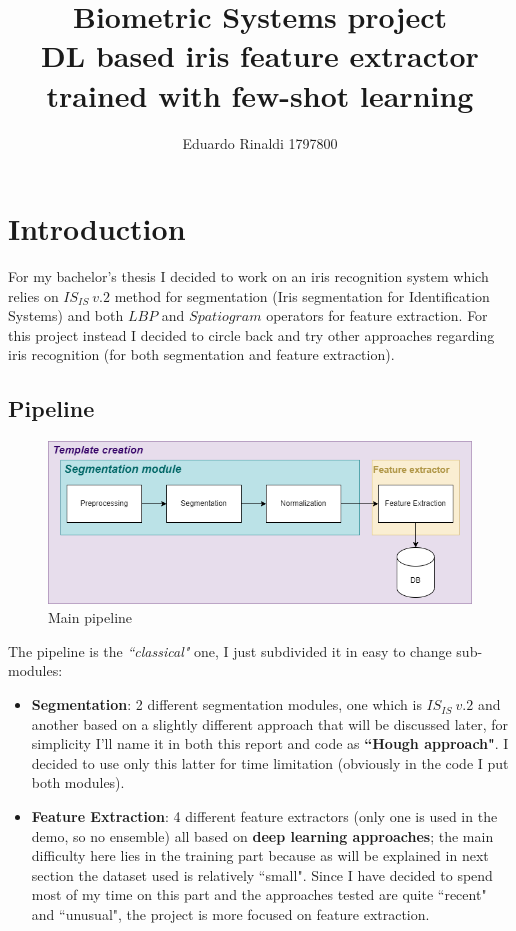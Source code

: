 \documentclass{article}
\title{%
  Biometric Systems project \\
  \large DL based iris feature extractor trained with few-shot learning}
\author{Eduardo Rinaldi 1797800}
\date{}
\begin{document}
\maketitle

\tableofcontents
\newpage

\section{Introduction}
For my bachelor's thesis I decided to work on an iris recognition system which relies on $IS_{IS} \ v.2$ method for segmentation (Iris segmentation for Identification Systems) and both $LBP$ and $Spatiogram$ operators for feature extraction. For this project instead I decided to circle back and try other approaches regarding iris recognition (for both segmentation and feature extraction).


\subsection{Pipeline}

\begin{figure}[H]
    \centering
    \includegraphics[width=5in]{imgs/MainPipeline.png}
    \caption{Main pipeline}
    \label{fig:MainPipeline}
\end{figure}

The pipeline is the \textit{``classical"} one, I just subdivided it in easy to change sub-modules:
\begin{itemize}
    \item \textbf{Segmentation}: 2 different segmentation modules, one which is $IS_{IS}\ v.2$ and another based on a slightly different approach that will be discussed later, for simplicity I'll name it in both this report and code as \textbf{ ``Hough approach"}. I decided to use only this latter for time limitation (obviously in the code I put both modules).
    \item \textbf{Feature Extraction}: 4 different feature extractors (only one is used in the demo, so no ensemble) all based on \textbf{deep learning approaches}; the main difficulty here lies in the training part because as will be explained in next section the dataset used is relatively ``small". Since I have decided to spend most of my time on this part and the approaches tested are quite ``recent" and ``unusual", the project is more focused on feature extraction.
\end{itemize}
\end{document}
